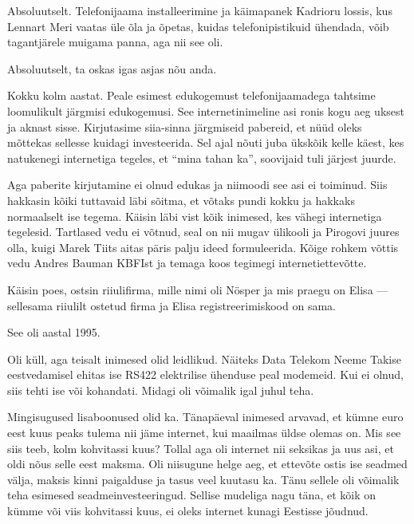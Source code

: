 
Absoluutselt. Telefonijaama installeerimine ja käimapanek Kadrioru lossis, 
kus Lennart Meri vaatas üle õla ja õpetas, kuidas 
telefonipistikuid ühendada, võib tagantjärele muigama panna, aga nii see 
oli. 


Absoluutselt, ta oskas igas asjas nõu anda.


Kokku kolm aastat. Peale esimest edukogemust telefonijaamadega tahtsime loomulikult 
järgmisi edukogemusi. See internetinimeline asi ronis 
kogu aeg uksest ja aknast sisse. Kirjutasime siia-sinna järgmiseid pabereid, et 
nüüd oleks mõttekas sellesse kuidagi investeerida. Sel ajal nõuti juba ükskõik kelle käest, kes natukenegi internetiga tegeles, et \enquote{mina tahan ka}, soovijaid tuli järjest juurde. 

Aga paberite kirjutamine ei olnud edukas ja niimoodi see asi ei toiminud. Siis hakkasin kõiki tuttavaid 
läbi sõitma, et võtaks pundi kokku ja hakkaks 
normaalselt ise tegema. Käisin läbi vist kõik inimesed, kes vähegi 
internetiga tegelesid. Tartlased vedu ei võtnud, seal on nii mugav ülikooli ja Pirogovi juures olla, kuigi Marek Tiits aitas päris palju ideed formuleerida. Kõige rohkem võttis 
vedu Andres Bauman KBFIst ja temaga 
koos tegimegi internetiettevõtte. 

Käisin poes, ostsin riiulifirma, mille nimi oli 
Nösper ja mis praegu on Elisa --- sellesama 
riiulilt ostetud firma ja Elisa registreerimiskood on sama. 


See oli aastal 1995.


Oli küll, aga teisalt inimesed olid leidlikud. Näiteks Data Telekom Neeme Takise eestvedamisel ehitas ise RS422 
elektrilise ühenduse peal modemeid. Kui ei olnud, siis tehti ise või kohandati. Midagi oli võimalik igal juhul teha.

Mingisugused lisaboonused olid ka. Tänapäeval inimesed arvavad, et kümne 
euro eest kuus peaks tulema nii jäme internet, kui maailmas üldse olemas on. 
Mis see siis teeb, kolm kohvitassi kuus? Tollal aga oli internet nii seksikas 
ja uus asi, et oldi nõus selle eest maksma. Oli niisugune helge aeg, et ettevõte ostis ise seadmed välja, maksis kinni paigalduse ja tasus veel 
kuutasu ka. Tänu sellele oli 
võimalik teha esimesed seadmeinvesteeringud. Sellise mudeliga nagu täna, et kõik on kümme või viis kohvitassi kuus, ei oleks internet kunagi Eestisse 
jõudnud.

